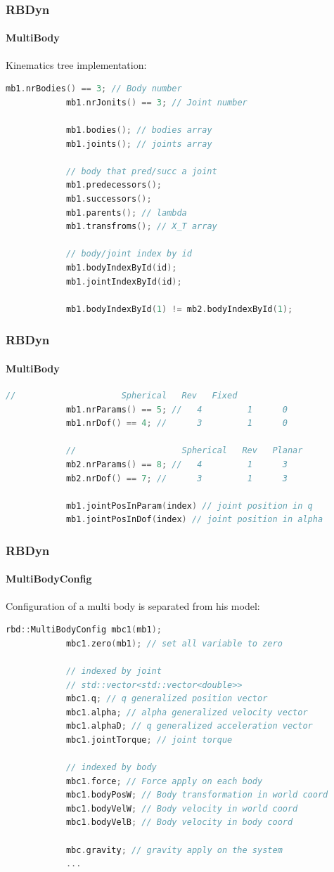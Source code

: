 \documentclass{beamer}
\begin{document}
	\begin{frame}[fragile]
		\frametitle{RBDyn}
		\framesubtitle{MultiBody}
		Kinematics tree implementation:
		\begin{lstlisting}[language=C++]
			mb1.nrBodies() == 3; // Body number
			mb1.nrJonits() == 3; // Joint number

			mb1.bodies(); // bodies array
			mb1.joints(); // joints array

			// body that pred/succ a joint
			mb1.predecessors();
			mb1.successors();
			mb1.parents(); // lambda
			mb1.transfroms(); // X_T array

			// body/joint index by id
			mb1.bodyIndexById(id);
			mb1.jointIndexById(id);

			mb1.bodyIndexById(1) != mb2.bodyIndexById(1);
		\end{lstlisting}
	\end{frame}
	\begin{frame}[fragile]
		\frametitle{RBDyn}
		\framesubtitle{MultiBody}
		\begin{lstlisting}[language=C++]
			//                     Spherical   Rev   Fixed
			mb1.nrParams() == 5; //   4         1      0
			mb1.nrDof() == 4; //      3         1      0

			//                     Spherical   Rev   Planar
			mb2.nrParams() == 8; //   4         1      3
			mb2.nrDof() == 7; //      3         1      3

			mb1.jointPosInParam(index) // joint position in q
			mb1.jointPosInDof(index) // joint position in alpha
		\end{lstlisting}
	\end{frame}

	\begin{frame}[fragile]
		\frametitle{RBDyn}
		\framesubtitle{MultiBodyConfig}
		Configuration of a multi body is separated from his model:
		\begin{lstlisting}[language=C++]
			rbd::MultiBodyConfig mbc1(mb1);
			mbc1.zero(mb1); // set all variable to zero

			// indexed by joint
			// std::vector<std::vector<double>>
			mbc1.q; // q generalized position vector
			mbc1.alpha; // alpha generalized velocity vector
			mbc1.alphaD; // q generalized acceleration vector
			mbc1.jointTorque; // joint torque

			// indexed by body
			mbc1.force; // Force apply on each body
			mbc1.bodyPosW; // Body transformation in world coord
			mbc1.bodyVelW; // Body velocity in world coord
			mbc1.bodyVelB; // Body velocity in body coord

			mbc.gravity; // gravity apply on the system
			...
		\end{lstlisting}
	\end{frame}
\end{document}

